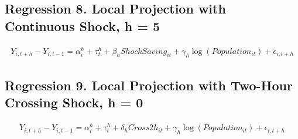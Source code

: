 \documentclass[a4paper, 10pt]{article}
\begin{document}
\begin{table}[H]
\centering
\caption{Regression 8. Local Projection with Continuous Shock, h = 4: 의사}

\end{table}

\subsection{Regression 8. Local Projection with Continuous Shock, h = 5}
\begin{align*}
    Y_{i,t+h}-Y_{i,t-1}=\alpha_i^h+\tau_t^h+\beta_h ShockSaving_{it}+\gamma_h\log(Population_{it})+\epsilon_{i,t+h}
\end{align*}
\begin{table}[H]
\centering
\caption{Regression 8. Local Projection with Continuous Shock, h = 5: 의원}

\end{table}

\begin{table}[H]
\centering
\caption{Regression 8. Local Projection with Continuous Shock, h = 5: 병원}

\end{table}

\begin{table}[H]
\centering
\caption{Regression 8. Local Projection with Continuous Shock, h = 5: 종합병원}

\end{table}

\begin{table}[H]
\centering
\caption{Regression 8. Local Projection with Continuous Shock, h = 5: 상급종합병원}

\end{table}

\begin{table}[H]
\centering
\caption{Regression 8. Local Projection with Continuous Shock, h = 5: 의사}

\end{table}

\subsection{Regression 9. Local Projection with Two-Hour Crossing Shock, h = 0}
\begin{align*}
    Y_{i,t+h}-Y_{i,t-1}=\alpha_i^h+\tau_t^h+\delta_h Cross2h_{it}+\gamma_h\log(Population_{it})+\epsilon_{i,t+h}
\end{align*}
\begin{table}[H]
\centering
\caption{Regression 9. Local Projection with Two-Hour Crossing Shock, h = 0: 의원}

\end{table}
\end{document}
